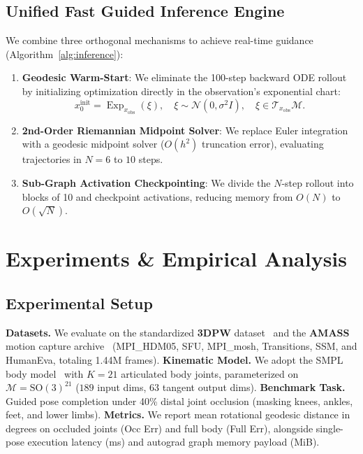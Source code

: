 \documentclass[10pt,twocolumn,letterpaper]{article}
\DeclareMathOperator{\Exp}{Exp}
\begin{document}
\subsection{Unified Fast Guided Inference Engine}
We combine three orthogonal mechanisms to achieve real-time guidance (Algorithm~\ref{alg:inference}):
\begin{enumerate}
    \item \textbf{Geodesic Warm-Start}: We eliminate the 100-step backward ODE rollout by initializing optimization directly in the observation's exponential chart:
    \begin{equation}
    x_0^{\mathrm{init}} = \Exp_{x_{\mathrm{obs}}}(\xi), \quad \xi \sim \mathcal{N}(0, \sigma^2 I), \quad \xi \in \mathcal{T}_{x_{\mathrm{obs}}}\mathcal{M}.
    \end{equation}
    \item \textbf{2nd-Order Riemannian Midpoint Solver}: We replace Euler integration with a geodesic midpoint solver ($O(h^2)$ truncation error), evaluating trajectories in $N=6$ to $10$ steps.
    \item \textbf{Sub-Graph Activation Checkpointing}: We divide the $N$-step rollout into blocks of 10 and checkpoint activations, reducing memory from $O(N)$ to $O(\sqrt{N})$.
\end{enumerate}

\section{Experiments \& Empirical Analysis}

\subsection{Experimental Setup}
\textbf{Datasets.} We evaluate on the standardized \textbf{3DPW} dataset~\cite{von2018recovering} and the \textbf{AMASS} motion capture archive~\cite{mahmood2019amass} (MPI\_HDM05, SFU, MPI\_mosh, Transitions, SSM, and HumanEva, totaling 1.44M frames).
\textbf{Kinematic Model.} We adopt the SMPL body model~\cite{loper2015smpl} with $K=21$ articulated body joints, parameterized on $\mathcal{M} = \mathrm{SO}(3)^{21}$ ($189$ input dims, $63$ tangent output dims).
\textbf{Benchmark Task.} Guided pose completion under 40\% distal joint occlusion (masking knees, ankles, feet, and lower limbs).
\textbf{Metrics.} We report mean rotational geodesic distance in degrees on occluded joints (Occ Err) and full body (Full Err), alongside single-pose execution latency (ms) and autograd graph memory payload (MiB).
\end{document}
